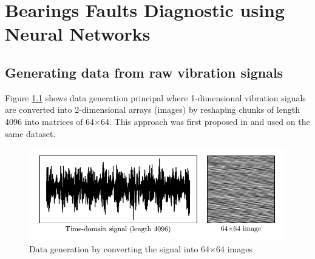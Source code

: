 \chapter{Bearings Faults Diagnostic using Neural Networks}


\section{Generating data from raw vibration signals}


Figure \ref{fig:cw_bearings_data_generation} shows data generation principal where 1-dimensional vibration signals are converted into 2-dimensional arrays (images) by reshaping chunks of length 4096 into matrices of 64$\times$64. This approach was first proposed in \cite{Wen2018} and used on the same dataset.

\begin{figure}[H]
	\centering
	\includegraphics{figures/cw_bearings_data_generation.pdf}
	\caption{Data generation by converting the signal into 64$\times$64 images}
	\label{fig:cw_bearings_data_generation}
\end{figure}



